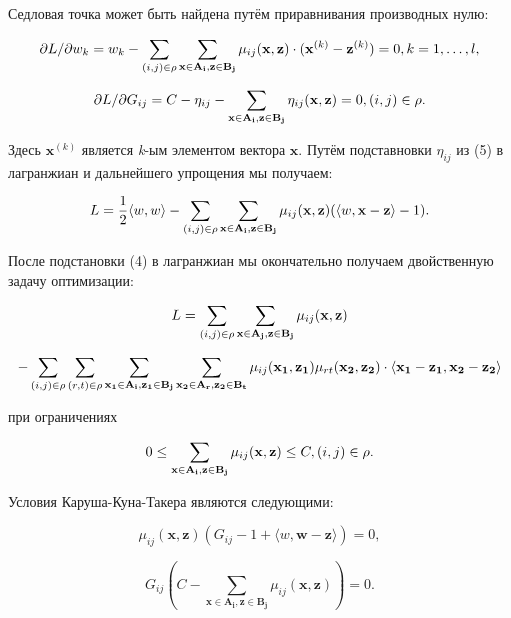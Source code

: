 \documentclass[12pt,a4paper,oneside]{article}
\begin{document}
\par
Седловая точка может быть найдена путём приравнивания производных нулю:

\[
\partial L / \partial w_k = w_k - \sum \limits_{(i, j) \in \mathrm{\rho}} \sum \limits_{\mathbf{x} \in \mathbf{A_i}, \mathbf{z} \in \mathbf{B_j}} \mu_{ij} (\mathbf{x}, \mathbf{z}) \cdot (\mathbf{x}^{(k)} - \mathbf{z}^{(k)}) = 0, k = 1, \dots, l,
\]

\[
\partial L / \partial G_{ij} = C - \eta_{ij} - \sum \limits_{\mathbf{x} \in \mathbf{A_i}, \mathbf{z} \in \mathbf{B_j}} \eta_{ij}(\mathbf{x}, \mathbf{z}) = 0, (i, j) \in \mathrm{\rho}. 
\]

\par
Здесь \(\mathbf{x}^{(k)}\) является \emph{k}-ым элементом вектора \(\mathbf{x}\). 
Путём подставновки \(\eta_{ij}\) из (5) в лагранжиан и дальнейшего упрощения мы получаем:

\[
L = \frac{1}{2} \langle w, w \rangle - \sum \limits_{(i, j) \in \mathrm{\rho}} \sum \limits_{\mathbf{x} \in \mathbf{A_i}, \mathbf{z} \in \mathbf{B_j}} \mu_{ij} (\mathbf{x}, \mathbf{z}) (\langle w, \mathbf{x} - \mathbf{z} \rangle - 1).
\]

\par
После подстановки (4) в лагранжиан мы окончательно получаем двойственную задачу оптимизации:

\[
L = \sum \limits_{(i, j) \in \mathrm{\rho}} \sum \limits_{\mathbf{x} \in \mathbf{A_j}, \mathbf{z} \in \mathbf{B_j}} \mu_{ij} (\mathbf{x}, \mathbf{z})
\]

\[
- \sum \limits_{(i, j) \in \mathrm{\rho}} \sum \limits_{(r, t) \in \mathrm{\rho}} \sum \limits_{\mathbf{x_1} \in \mathbf{A_i}, \mathbf{z_1} \in \mathbf{B_j}} \sum \limits_{\mathbf{x_2} \in \mathbf{A_r}, \mathbf{z_2} \in \mathbf{B_t}} \mu_{ij} (\mathbf{x_1}, \mathbf{z_1}) \mu_{rt} (\mathbf{x_2}, \mathbf{z_2}) \cdot \langle \mathbf{x_1} - \mathbf{z_1}, \mathbf{x_2} - \mathbf{z_2} \rangle
\]

\par
при ограничениях

\[
0 \leq \sum \limits_{\mathbf{x} \in \mathbf{A_i}, \mathbf{z} \in \mathbf{B_j}} \mu_{ij} (\mathbf{x}, \mathbf{z}) \leq C, (i, j) \in \mathrm{\rho}.
\]

\par
Условия Каруша-Куна-Такера являются следующими:

\[
\mu_{ij} (\mathbf{x}, \mathbf{z}) (G_{ij} - 1 + \langle w, \mathbf{w} - \mathbf{z} \rangle) = 0,
\]

\[
G_{ij} (C - \sum \limits_{\mathbf{x} \in \mathbf{A_i}, \mathbf{z} \in \mathbf{B_j}} \mu_{ij} (\mathbf{x}, \mathbf{z})) = 0.
\]
\end{document}
